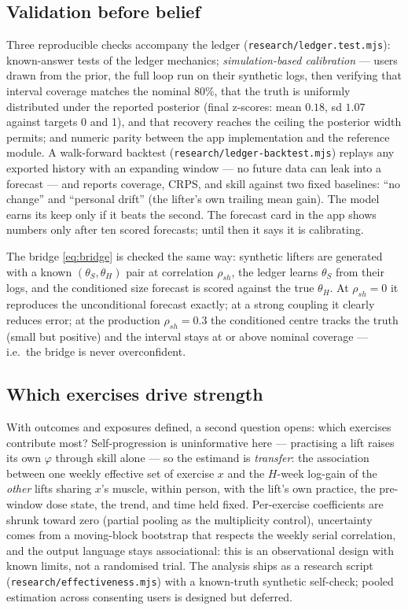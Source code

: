 \documentclass[11pt,a4paper]{article}
\begin{document}
\subsection{Validation before belief}\label{sec:ledgerval}
Three reproducible checks accompany the ledger (\texttt{research/ledger.test.mjs}): known-answer tests of the ledger mechanics; \emph{simulation-based calibration} --- users drawn from the prior, the full loop run on their synthetic logs, then verifying that interval coverage matches the nominal 80\%, that the truth is uniformly distributed under the reported posterior (final z-scores: mean $0.18$, sd $1.07$ against targets 0 and 1), and that recovery reaches the ceiling the posterior width permits; and numeric parity between the app implementation and the reference module. A walk-forward backtest (\texttt{research/ledger-backtest.mjs}) replays any exported history with an expanding window --- no future data can leak into a forecast --- and reports coverage, CRPS, and skill against two fixed baselines: ``no change'' and ``personal drift'' (the lifter's own trailing mean gain). The model earns its keep only if it beats the second. The forecast card in the app shows numbers only after ten scored forecasts; until then it says it is calibrating.

The bridge \eqref{eq:bridge} is checked the same way: synthetic lifters are generated with a known $(\theta_S,\theta_H)$ pair at correlation $\rho_{sh}$, the ledger learns $\theta_S$ from their logs, and the conditioned size forecast is scored against the true $\theta_H$. At $\rho_{sh}=0$ it reproduces the unconditional forecast exactly; at a strong coupling it clearly reduces error; at the production $\rho_{sh}=0.3$ the conditioned centre tracks the truth (small but positive) and the interval stays at or above nominal coverage --- i.e.\ the bridge is never overconfident.

\subsection{Which exercises drive strength}
With outcomes and exposures defined, a second question opens: which exercises contribute most? Self-progression is uninformative here --- practising a lift raises its own $\varphi$ through skill alone --- so the estimand is \emph{transfer}: the association between one weekly effective set of exercise $x$ and the $H$-week log-gain of the \emph{other} lifts sharing $x$'s muscle, within person, with the lift's own practice, the pre-window dose state, the trend, and time held fixed. Per-exercise coefficients are shrunk toward zero (partial pooling as the multiplicity control), uncertainty comes from a moving-block bootstrap that respects the weekly serial correlation, and the output language stays associational: this is an observational design with known limits, not a randomised trial. The analysis ships as a research script (\texttt{research/effectiveness.mjs}) with a known-truth synthetic self-check; pooled estimation across consenting users is designed but deferred.
\end{document}
